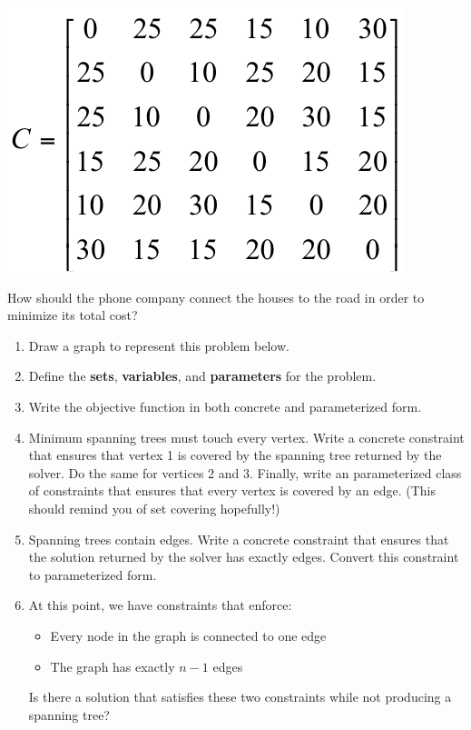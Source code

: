 \documentclass[11pt]{article}
\theoremstyle{definition}
\newcommand{\answerbox}[3]{%
  \fbox{%
    \begin{minipage}[#1]{#2}
      \hfill\vspace{#3}
    \end{minipage}
  }
}
\newcommand{\catbox}{\answerbox{c}{.5in}{.7cm}}
\newcommand{\letterbox}{\answerbox{c}{.7cm}{.7cm}}
\begin{document}
\begin{center}
\includegraphics[width = .3\textwidth]{costs}
\end{center}

How should the phone company connect the houses to the road in order to minimize its
total cost?

\begin{enumerate}[resume]
\item Draw a graph to represent this problem below. 

\vfill

\item Define the \textbf{sets}, \textbf{variables}, and \textbf{parameters} for the problem.  
\vfill 
\newpage

\item Write the objective function in both concrete and parameterized form. \vspace{1.5in}

\item Minimum spanning trees must touch every vertex.  Write a concrete constraint that ensures that vertex 1 is covered by the spanning tree returned by the solver.  Do the same for vertices 2 and 3.  Finally, write an parameterized class of constraints that ensures that every vertex is covered by an edge. (This should remind you of set covering hopefully!)

\vfill

\item Spanning trees contain \catbox edges.  Write a concrete constraint that ensures that the solution returned by the solver has exactly \letterbox edges.  Convert this constraint to parameterized form.
\vfill

\newpage
\item At this point, we have constraints that enforce:
	\begin{itemize}
	\item Every node in the graph is connected to one edge
	\item The graph has exactly $n-1$ edges
	\end{itemize}
Is there a solution that satisfies these two constraints while not producing a spanning tree?


\end{enumerate}
\end{document}

